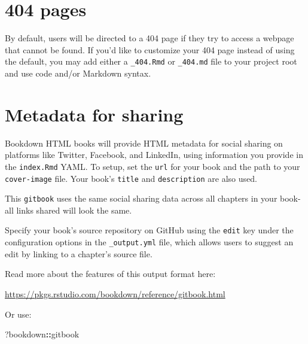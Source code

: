 \documentclass[
]{book}
\newenvironment{Shaded}{\begin{snugshade}}{\end{snugshade}}
\newcommand{\NormalTok}[1]{#1}
\newcommand{\SpecialCharTok}[1]{\textcolor[rgb]{0.81,0.36,0.00}{\textbf{#1}}}
\theoremstyle{definition}
\theoremstyle{definition}
\theoremstyle{definition}
\theoremstyle{definition}
\theoremstyle{remark}
\begin{document}
\section{404 pages}\label{pages}

By default, users will be directed to a 404 page if they try to access a webpage that cannot be found. If you'd like to customize your 404 page instead of using the default, you may add either a \texttt{\_404.Rmd} or \texttt{\_404.md} file to your project root and use code and/or Markdown syntax.

\section{Metadata for sharing}\label{metadata-for-sharing}

Bookdown HTML books will provide HTML metadata for social sharing on platforms like Twitter, Facebook, and LinkedIn, using information you provide in the \texttt{index.Rmd} YAML. To setup, set the \texttt{url} for your book and the path to your \texttt{cover-image} file. Your book's \texttt{title} and \texttt{description} are also used.

This \texttt{gitbook} uses the same social sharing data across all chapters in your book- all links shared will look the same.

Specify your book's source repository on GitHub using the \texttt{edit} key under the configuration options in the \texttt{\_output.yml} file, which allows users to suggest an edit by linking to a chapter's source file.

Read more about the features of this output format here:

\url{https://pkgs.rstudio.com/bookdown/reference/gitbook.html}

Or use:

\begin{Shaded}
\begin{Highlighting}[]
\NormalTok{?bookdown}\SpecialCharTok{::}\NormalTok{gitbook}
\end{Highlighting}
\end{Shaded}


  
\end{document}
